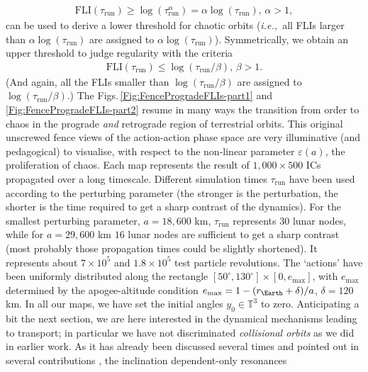\documentclass{amsart}
\theoremstyle{definition}
\theoremstyle{remark}
\numberwithin{equation}{section}
\newcommand{\ie}{\textit{i.e.,\ }}
\begin{document}
\begin{align}\label{Eq:FLIChaos}
\textrm{FLI}(\tau_{\textrm{run}}) \ge \log(\tau_{\textrm{run}}^{\alpha}) = \alpha   \log(\tau_{\textrm{run}}),\, \alpha >1,
\end{align}
can be used to derive a lower threshold for chaotic orbits (\ie all FLIs larger than $\alpha   \log(\tau_{\textrm{run}})$ are assigned to $\alpha   \log(\tau_{\textrm{run}})$). Symmetrically, we obtain an  upper threshold to judge regularity with the criteria 
\begin{align}
\textrm{FLI}(\tau_{\textrm{run}}) \le \log(\tau_{\textrm{run}}/{\beta}),\, \beta >1.
\end{align} 
(And again, all the FLIs smaller than $ \log(\tau_{\textrm{run}}/{\beta})$ are assigned to $\log(\tau_{\textrm{run}}/{\beta})$.)
The Figs.\,\ref{Fig:FenceProgradeFLIs-part1} and \ref{Fig:FenceProgradeFLIs-part2} resume in many ways the transition from order to chaos in the prograde \textit{and} retrograde region of terrestrial orbits. This original unscrewed fence views of the action-action phase space are very illuminative (and pedagogical) 
to visualise, with respect to the non-linear parameter $\varepsilon(a)$,  the 
proliferation of chaos. 
Each map represents the result of  $1,000 \times 500$ ICs 
propagated over a {\color{black}long timescale.}  Different simulation times $\tau_{\textrm{run}}$ have been used according to the perturbing parameter (the stronger is the perturbation, the shorter is the time required to get a sharp contrast of the dynamics). For the smallest perturbing parameter, $a=18,600$ km, $\tau_{\textrm{run}}$ represents $30$ lunar nodes, while for 
$a=29,600$ km $16$ lunar nodes are sufficient to get a sharp contrast (most probably those propagation times could be slightly shortened). It represents about $7 \times 10^{5}$ and $1.8 \times 10^{5}$ test {\color{black}particle revolutions}. The `actions' have been uniformly distributed along the rectangle 
$[50^{\circ},130^{\circ}] \times [0,e_{\max}]$, with $e_{\max}$
determined by the apogee-altitude condition 
$e_{\max}=1-(r_{\Earth}+\delta)/a$,  $\delta = 120$ km. In all our maps, we have  set the initial angles $y_{0} \in \mathbb{T}^{3}$ to zero.  Anticipating a bit the next section, we are here interested in the  dynamical mechanisms leading to transport; in particular we have not discriminated  \textit{collisional orbits} as we did in earlier work.   As it has already been discussed several times and pointed out in several contributions \citep{jDa16,iGk16,aCe16}, the inclination dependent-only resonances
\end{document}
